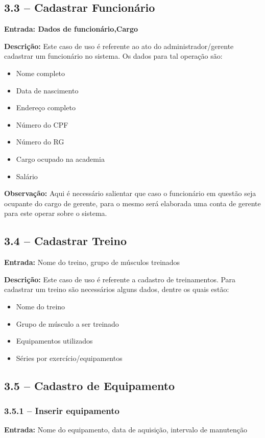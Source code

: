 \documentclass[12pt,a4paper,oneside]{report}
\begin{document}
	\subsection*{3.3 -- Cadastrar Funcionário}
	\textbf{Entrada: Dados de funcionário,Cargo}
	
	\textbf{Descrição:} Este caso de uso é referente ao ato do administrador/gerente cadastrar um funcionário no sistema. Os dados para tal operação são: 
	
	\begin{itemize}
		\item Nome completo
		\item Data de nascimento
		\item Endereço completo 
		\item Número do CPF
		\item Número do RG
		\item Cargo ocupado na academia
		\item Salário
	\end{itemize} 
	\textbf{Observação:} Aqui é necessário salientar que caso o funcionário em questão seja ocupante do cargo de gerente, para o mesmo será elaborada uma conta de gerente para este operar sobre o sistema.
	
	\subsection*{3.4 -- Cadastrar Treino}
	\textbf{Entrada:} Nome do treino, grupo de músculos treinados
	
	\textbf{Descrição:} Este caso de uso é referente a cadastro de treinamentos. Para cadastrar um treino são necessários alguns dados, dentre os quais estão:
	
	\begin{itemize}
		\item Nome do treino
		\item Grupo de músculo a ser treinado
		\item Equipamentos utilizados
		\item Séries por exercício/equipamentos
	\end{itemize}
	\subsection*{3.5 -- Cadastro de Equipamento}
	\subsubsection*{3.5.1 -- Inserir equipamento}
	\textbf{Entrada:} Nome do equipamento, data de aquisição, intervalo de manutenção
	
\end{document}

